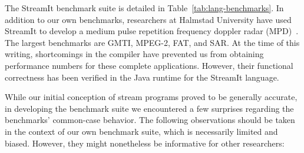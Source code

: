 
The StreamIt benchmark suite is detailed in
Table~\ref{tab:lang-benchmarks}.  In addition to our own benchmarks,
researchers at Halmstad University have used StreamIt to develop a
medium pulse repetition frequency doppler radar
(MPD)~\cite{ola-techrep}.  The largest benchmarks are GMTI, MPEG-2,
FAT, and SAR.  At the time of this writing, shortcomings in the
compiler have prevented us from obtaining performance numbers for
these complete applications.  However, their functional correctness
has been verified in the Java runtime for the StreamIt language.

While our initial conception of stream programs proved to be generally
accurate, in developing the benchmark suite we encountered a few
surprises regarding the benchmarks' common-case behavior.  The
following observations should be taken in the context of our own
benchmark suite, which is necessarily limited and biased.  However,
they might nonetheless be informative for other researchers:


